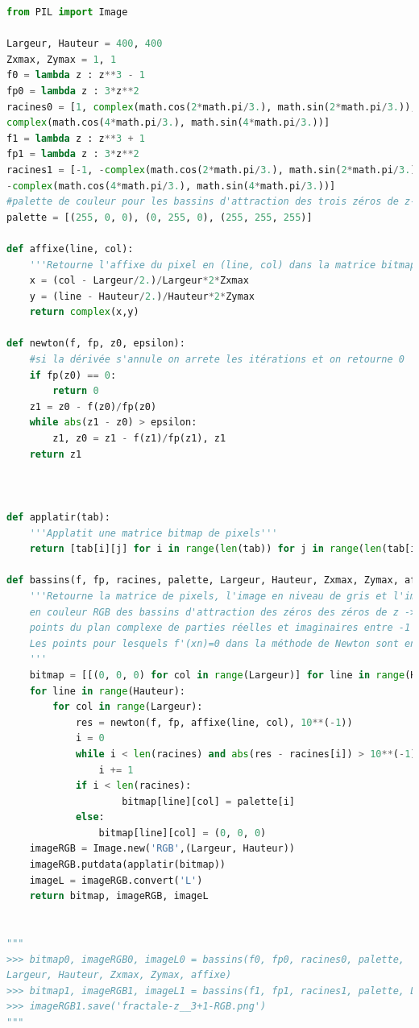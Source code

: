\documentclass[
  11pt,
]{article}
\newcounter{def}
\begin{document}
\begin{lstlisting}[language=Python]
from PIL import Image

Largeur, Hauteur = 400, 400
Zxmax, Zymax = 1, 1
f0 = lambda z : z**3 - 1
fp0 = lambda z : 3*z**2
racines0 = [1, complex(math.cos(2*math.pi/3.), math.sin(2*math.pi/3.)),
complex(math.cos(4*math.pi/3.), math.sin(4*math.pi/3.))]
f1 = lambda z : z**3 + 1
fp1 = lambda z : 3*z**2
racines1 = [-1, -complex(math.cos(2*math.pi/3.), math.sin(2*math.pi/3.)),
-complex(math.cos(4*math.pi/3.), math.sin(4*math.pi/3.))]
#palette de couleur pour les bassins d'attraction des trois zéros de z->z**3+1
palette = [(255, 0, 0), (0, 255, 0), (255, 255, 255)]

def affixe(line, col):
    '''Retourne l'affixe du pixel en (line, col) dans la matrice bitmap'''
    x = (col - Largeur/2.)/Largeur*2*Zxmax
    y = (line - Hauteur/2.)/Hauteur*2*Zymax
    return complex(x,y) 
    
def newton(f, fp, z0, epsilon):
    #si la dérivée s'annule on arrete les itérations et on retourne 0
    if fp(z0) == 0:
        return 0
    z1 = z0 - f(z0)/fp(z0)
    while abs(z1 - z0) > epsilon:
        z1, z0 = z1 - f(z1)/fp(z1), z1
    return z1



def applatir(tab):
    '''Applatit une matrice bitmap de pixels'''
    return [tab[i][j] for i in range(len(tab)) for j in range(len(tab[i]))]
    
def bassins(f, fp, racines, palette, Largeur, Hauteur, Zxmax, Zymax, affixe):
    '''Retourne la matrice de pixels, l'image en niveau de gris et l'image
    en couleur RGB des bassins d'attraction des zéros des zéros de z -> f(z) de dérivée z -> fp(z, pour les 
    points du plan complexe de parties réelles et imaginaires entre -1 et 1.
    Les points pour lesquels f'(xn)=0 dans la méthode de Newton sont en noir.
    '''
    bitmap = [[(0, 0, 0) for col in range(Largeur)] for line in range(Hauteur)]    
    for line in range(Hauteur):
        for col in range(Largeur):
            res = newton(f, fp, affixe(line, col), 10**(-1))
            i = 0
            while i < len(racines) and abs(res - racines[i]) > 10**(-1):
                i += 1
            if i < len(racines):
                    bitmap[line][col] = palette[i]
            else:
                bitmap[line][col] = (0, 0, 0)
    imageRGB = Image.new('RGB',(Largeur, Hauteur))
    imageRGB.putdata(applatir(bitmap))
    imageL = imageRGB.convert('L')
    return bitmap, imageRGB, imageL


"""
>>> bitmap0, imageRGB0, imageL0 = bassins(f0, fp0, racines0, palette,
Largeur, Hauteur, Zxmax, Zymax, affixe) 
>>> bitmap1, imageRGB1, imageL1 = bassins(f1, fp1, racines1, palette, Largeur, Hauteur, Zxmax, Zymax, affixe)
>>> imageRGB1.save('fractale-z__3+1-RGB.png')
"""
\end{lstlisting}
\end{document}

